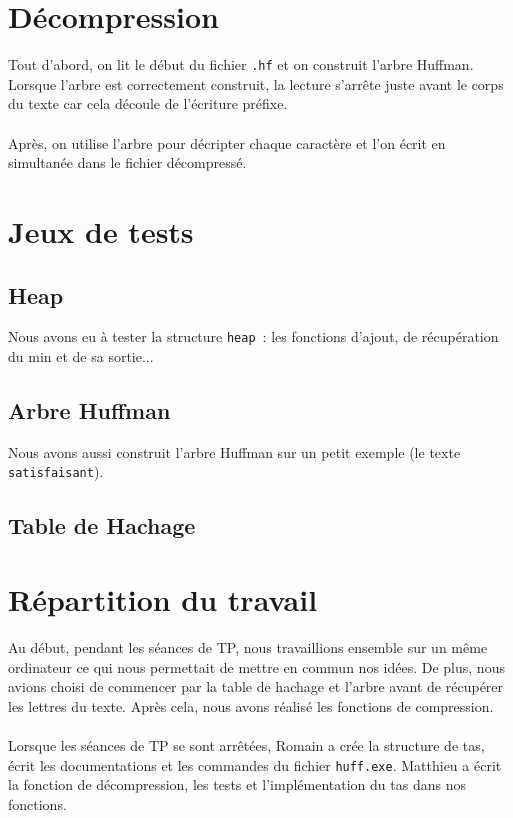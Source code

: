 \documentclass{article}
\begin{document}
  \section*{Décompression}
  Tout d'abord, on lit le début du fichier \texttt{.hf} et on construit l'arbre Huffman. Lorsque l'arbre est correctement construit, la lecture s'arrête juste avant le corps du texte car cela découle de l'écriture préfixe. \\ \\
  Après, on utilise l'arbre pour décripter chaque caractère et l'on écrit en simultanée dans le fichier décompressé.

  \section*{Jeux de tests}
  \subsection*{Heap}
  Nous avons eu à tester la structure \texttt{heap}~: les fonctions d'ajout, de récupération du min et de sa sortie... \\
  \subsection*{Arbre Huffman}
  Nous avons aussi construit l'arbre Huffman sur un petit exemple (le texte \texttt{satisfaisant}).
  \subsection*{Table de Hachage}

  \section*{Répartition du travail}
  Au début, pendant les séances de TP, nous travaillions ensemble sur un même ordinateur ce qui nous permettait de mettre en commun nos idées. De plus, nous avions choisi de commencer par la table de hachage et l'arbre avant de récupérer les lettres du texte. Après cela, nous avons réalisé les fonctions de compression. \\ \\
  Lorsque les séances de TP se sont arrêtées, Romain a crée la structure de tas, écrit les documentations et les commandes du fichier \texttt{huff.exe}. Matthieu a écrit la fonction de décompression, les tests et l'implémentation du tas dans nos fonctions.
\end{document}
